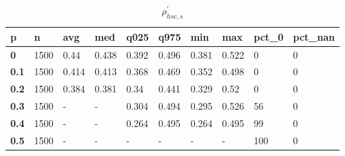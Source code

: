 \begin{table}[h]
 \centering 
\footnotesize
\caption{$\rho_{hsc,s}^\prime $}
\label{tab:alphahscs}
\begin{tabular}[h]{|l|l|l|l|l|l|l|l|l|l|
    } \hline
\textbf{ p} & \textbf{ n} & \textbf{ avg} & \textbf{ med} & \textbf{ q025} & \textbf{ q975} & \textbf{ min} & \textbf{ max} & \textbf{ pct\_0} & \textbf{ pct\_nan}
    \\ \hline
  \textbf{  0} & 1500 &  0.44 & 0.438 & 0.392 & 0.496 & 0.381 & 0.522 &   0 & 0
    \\ \hline
  \textbf{0.1} & 1500 & 0.414 & 0.413 & 0.368 & 0.469 & 0.352 & 0.498 &   0 & 0
    \\ \hline
  \textbf{0.2} & 1500 & 0.384 & 0.381 &  0.34 & 0.441 & 0.329 &  0.52 &   0 & 0
    \\ \hline
  \textbf{0.3} & 1500 & - & - & 0.304 & 0.494 & 0.295 & 0.526 &  56 & 0
    \\ \hline
  \textbf{0.4} & 1500 & - & - & 0.264 & 0.495 & 0.264 & 0.495 &  99 & 0
    \\ \hline
  \textbf{0.5} & 1500 & - & - & - & - & - & - & 100 & 0
    \\ \hline
 \end{tabular}
 \end{table}

